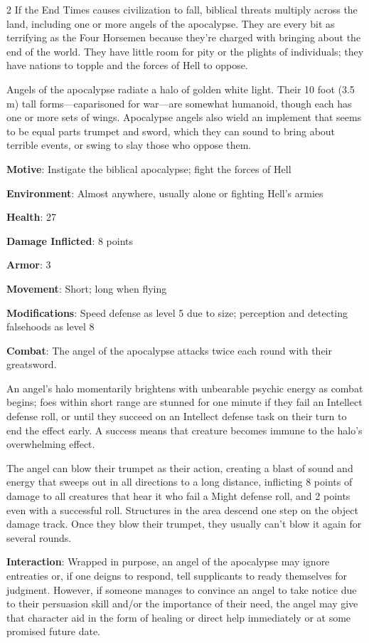 \begin{multicols}{2}
 If the End Times causes civilization to fall, biblical threats multiply across the land, including one or more angels of the apocalypse. They are every bit as terrifying as the Four Horsemen because they’re charged with bringing about the end of the world. They have little room for pity or the plights of individuals; they have nations to topple and the forces of Hell to oppose. 

Angels of the apocalypse radiate a halo of golden white light. Their 10 foot (3.5 m) tall forms—caparisoned for war—are somewhat humanoid, though each has one or more sets of wings. Apocalypse angels also wield an implement that seems to be equal parts trumpet and sword, which they can sound to bring about terrible events, or swing to slay those who oppose them.
 
\textbf{Motive}: Instigate the biblical apocalypse; fight the forces of Hell 

\textbf{Environment}: Almost anywhere, usually alone or fighting Hell’s armies 

\textbf{Health}: 27 

\textbf{Damage Inflicted}: 8 points 

\textbf{Armor}: 3 

\textbf{Movement}: Short; long when flying 

\textbf{Modifications}: Speed defense as level 5 due to size; perception and detecting falsehoods as level 8 

\textbf{Combat}: The angel of the apocalypse attacks twice each round with their greatsword. 

An angel’s halo momentarily brightens with unbearable psychic energy as combat begins; foes within short range are stunned for one minute if they fail an Intellect defense roll, or until they succeed on an Intellect defense task on their turn to end the effect early. A success means that creature becomes immune to the halo’s overwhelming effect. 
 
The angel can blow their trumpet as their action, creating a blast of sound and energy that sweeps out in all directions to a long distance, inflicting 8 points of damage to all creatures that hear it who fail a Might defense roll, and 2 points even with a successful roll. Structures in the area descend one step on the object damage track. Once they blow their trumpet, they usually can’t blow it again for several rounds. 

\textbf{Interaction}: Wrapped in purpose, an angel of the apocalypse may ignore entreaties or, if one deigns to respond, tell supplicants to ready themselves for judgment. However, if someone manages to convince an angel to take notice due to their persuasion skill and/or the importance of their need, the angel may give that character aid in the form of healing or direct help immediately or at some promised future date. 


\end{multicols}
